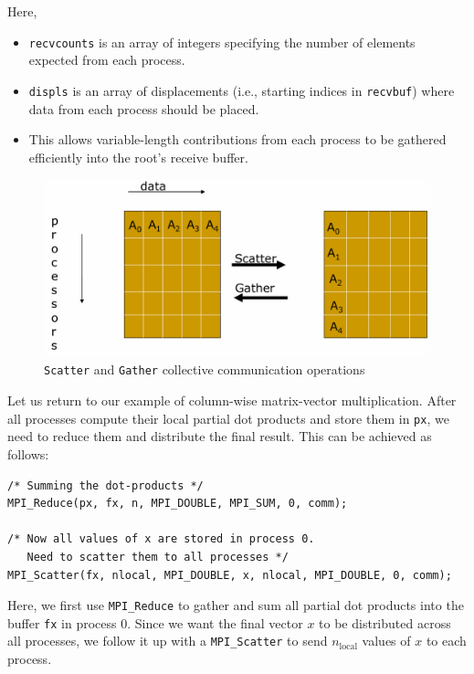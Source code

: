 \documentclass[12pt]{book}
\begin{document}
Here,
\begin{itemize}
    \item \texttt{recvcounts} is an array of integers specifying the number of elements expected from each process.
    \item \texttt{displs} is an array of displacements (i.e., starting indices in \texttt{recvbuf}) where data from each process should be placed.
    \item This allows variable-length contributions from each process to be gathered efficiently into the root's receive buffer.
\end{itemize}
\begin{figure}[ht]
    \centering
    \includegraphics[width=0.75\linewidth]{images/scatter_gather.png}
    \caption{\texttt{Scatter} and \texttt{Gather} collective communication operations}
    \label{fig:scattergather}
\end{figure}

\vspace{1em}
Let us return to our example of column-wise matrix-vector multiplication. After all processes compute their local partial dot products and store them in \texttt{px}, we need to reduce them and distribute the final result. This can be achieved as follows:

\begin{lstlisting}[style=cppstyle]
/* Summing the dot-products */
MPI_Reduce(px, fx, n, MPI_DOUBLE, MPI_SUM, 0, comm);

/* Now all values of x are stored in process 0. 
   Need to scatter them to all processes */
MPI_Scatter(fx, nlocal, MPI_DOUBLE, x, nlocal, MPI_DOUBLE, 0, comm);
\end{lstlisting}

Here, we first use \texttt{MPI\_Reduce} to gather and sum all partial dot products into the buffer \texttt{fx} in process 0. Since we want the final vector $x$ to be distributed across all processes, we follow it up with a \texttt{MPI\_Scatter} to send $n_\text{local}$ values of $x$ to each process.
\end{document}
